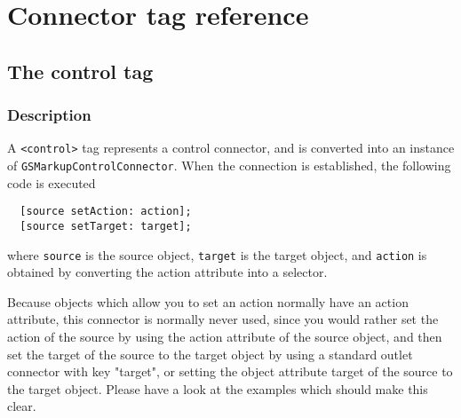 
\section{Connector tag reference}

\subsection{The control tag}

\subsubsection{Description}
A \texttt{<control>} tag represents a control connector, and is
converted into an instance of \texttt{GSMarkupControlConnector}.  When the
connection is established, the following code is executed
\begin{verbatim}
  [source setAction: action];
  [source setTarget: target];
\end{verbatim}
where \texttt{source} is the source object, \texttt{target} is the
target object, and \texttt{action} is obtained by converting the
action attribute into a selector.

Because objects which allow you to set an action normally have an
action attribute, this connector is normally never used, since you
would rather set the action of the source by using the action
attribute of the source object, and then set the target of the source
to the target object by using a standard outlet connector with key
"target", or setting the object attribute target of the source to the
target object.  Please have a look at the examples which should make
this clear.

